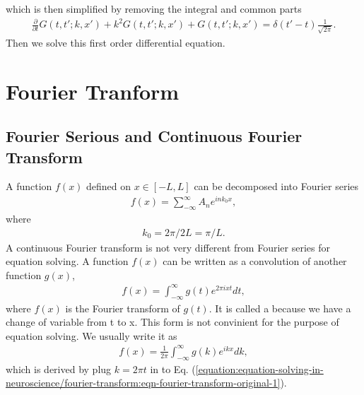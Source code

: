 \documentclass[letterpaper,10pt,english]{sphinxmanual}
\begin{document}
which is then simplified by removing the integral and common parts
\begin{equation*}
\begin{split}\frac{\partial}{\partial t} G(t,t';k,x')  + k^2 G(t,t';k,x') + G(t,t';k,x') = \delta(t'-t) \frac{1}{\sqrt{2\pi}} .\end{split}
\end{equation*}
Then we solve this first order differential equation.


\section{Fourier Tranform}
\label{\detokenize{equation-solving-in-neuroscience/fourier-transform:fourier-tranform}}\label{\detokenize{equation-solving-in-neuroscience/fourier-transform::doc}}

\subsection{Fourier Serious and Continuous Fourier Transform}
\label{\detokenize{equation-solving-in-neuroscience/fourier-transform:fourier-serious-and-continuous-fourier-transform}}
A function \(f(x)\) defined on \(x\in [-L, L]\) can be decomposed into Fourier series
\begin{equation*}
\begin{split}f(x) = \sum_{-\infty}^\infty A_n e^{i n k_0 x },\end{split}
\end{equation*}
where
\begin{equation*}
\begin{split}k_0 = 2 \pi/ 2 L = \pi/L.\end{split}
\end{equation*}
A continuous Fourier transform is not very different from Fourier series for equation solving. A function \(f(x)\) can be written as a convolution of another function \(g(x)\),
\label{\detokenize{equation-solving-in-neuroscience/fourier-transform:equation-eqn-fourier-transform-original-1}}\begin{equation}\label{equation:equation-solving-in-neuroscience/fourier-transform:eqn-fourier-transform-original-1}
\begin{split}f(x) = \int_{-\infty}^\infty g(t) e^{2\pi i x t} dt,\end{split}
\end{equation}
where \(f(x)\) is the Fourier transform of \(g(t)\). It is called a  because we have a change of variable from t to x. This form is not convinient for the purpose of equation solving. We usually write it as
\begin{equation*}
\begin{split}f(x) = \frac{1}{2\pi}\int_{-\infty}^\infty g(k) e^{i k x} dk,\end{split}
\end{equation*}
which is derived by plug \(k=2\pi t\) in to Eq. (\eqref{equation:equation-solving-in-neuroscience/fourier-transform:eqn-fourier-transform-original-1}).
\end{document}

